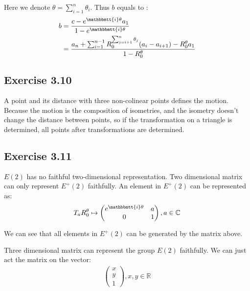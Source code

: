 \documentclass[]{ctexart}
\newcommand{\mi}{\mathbbmtt{i}}
\begin{document}
		Here we denote $\theta=\sum_{i=1}^{n}\theta_{i}$. Thus $b$ equals to :
			\begin{equation*}
			\begin{aligned}
				b&=\frac{c-e^{\mi \theta}a_1}{1-e^{\mi \theta}}\\
				 &=\frac{a_n+\sum_{i=1}^{n-1}R_0^{\sum_{j=i+1}^{n}\theta_{j}}(a_{i}-a_{i+1})-R_0^{\theta}a_1}{1-R_0^{\theta}}
			\end{aligned}
			\end{equation*}
	
	\subsection{Exercise 3.10}
		A point and its distance with three non-colinear points defines the motion. Because the motion is the composition of isometries, and the isometry doesn't change the distance between points, so if the transformation on a triangle is determined, all points after transformations are determined.
		
	\subsection{Exercise 3.11}
		$E(2)$ has no faithful two-dimensional representation. Two dimensional matrix can only represent $E^+(2)$ faithfully. An element in $E^+(2)$ can be represented as:
			\begin{equation*}
			\begin{aligned}
				T_aR^{\theta}_0\mapsto 
				\begin{pmatrix}
				e^{\mi \theta} & a\\
				0 & 1
				\end{pmatrix},a\in \mathbb{C}
			\end{aligned}
			\end{equation*}
		
		We can see that all elements in $E^+(2)$ can be generated by the matrix above. 
		
		Three dimensional matrix can represent the group $E(2)$ faithfully. We can just act the matrix on the vector:
			\begin{equation*}
			\begin{aligned}
				\begin{pmatrix}
				x\\
				y\\
				1
				\end{pmatrix},x,y\in \mathbb{R}
			\end{aligned}
			\end{equation*}
		
\end{document}
